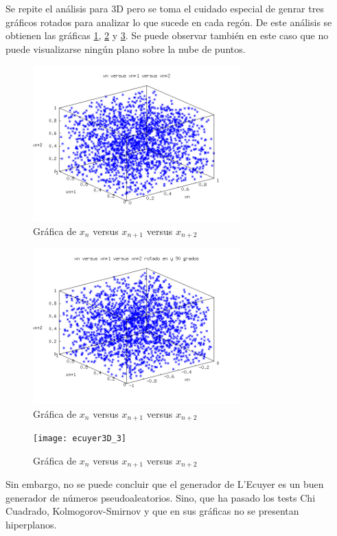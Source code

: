 \documentclass{sig-alternate}
\begin{document}
Se repite el an\'alisis para 3D pero se toma el cuidado especial de genrar tres gr\'aficos rotados
para analizar lo que sucede en cada reg\'on. De este an\'alisis se obtienen las gr\'aficas
\ref{fig:ecuyer_3D_1}, \ref{fig:ecuyer_3D_2} y \ref{fig:ecuyer_3D_3}. Se puede observar
tambi\'en en este caso que no puede visualizarse ning\'un plano sobre la nube de puntos. \\


\begin{figure}[ht]
\label{fig:ecuyer_3D_1}
\includegraphics[width=8cm]{ecuyer3D_1}
\caption{Gr\'afica de $x_{n}$ versus $x_{n+1}$ versus $x_{n+2}$}
\end{figure}

\begin{figure}[ht]
\label{fig:ecuyer_3D_2}
\includegraphics[width=8cm]{ecuyer3D_2}
\caption{Gr\'afica de $x_{n}$ versus $x_{n+1}$ versus $x_{n+2}$}
\end{figure}

\begin{figure}[ht]
\label{fig:ecuyer_3D_3}
\texttt{[image: ecuyer3D\_3]}
\caption{Gr\'afica de $x_{n}$ versus $x_{n+1}$ versus $x_{n+2}$}
\end{figure}

Sin embargo, no se puede concluir que el generador de L'Ecuyer es un buen generador de n\'umeros
pseudoaleatorios. Sino, que ha pasado los tests Chi Cuadrado, Kolmogorov-Smirnov y que en sus
gr\'aficas no se presentan hiperplanos.
\end{document}
